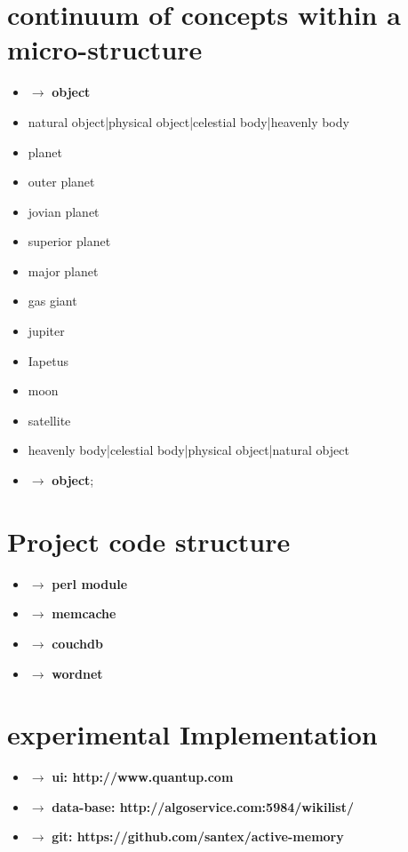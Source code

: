 \documentclass[15pt]{article}
\begin{document}
\vskip 0.4cm

\section{continuum of concepts within a micro-structure}  
  
\begin{itemize}
\item $\rightarrow$ \textbf{object}
\item natural object|physical object|celestial body|heavenly body
\item planet
\item outer planet
\item jovian planet
\item superior planet
\item major planet
\item gas giant
\item jupiter
\item Iapetus
\item moon
\item satellite
\item heavenly body|celestial body|physical object|natural object 
\item $\rightarrow$ \textbf{object};
\end{itemize}   
\vskip 9cm

\section{Project code structure}

\begin{itemize}
\item $\rightarrow$ \textbf{perl module}
\item $\rightarrow$ \textbf{memcache}
\item $\rightarrow$ \textbf{couchdb}
\item $\rightarrow$ \textbf{wordnet}
\end{itemize}   



\section{experimental Implementation}

\begin{itemize}
\item $\rightarrow$ \textbf{ui: http://www.quantup.com}
\item $\rightarrow$ \textbf{data-base: http://algoservice.com:5984/wikilist/}
\item $\rightarrow$ \textbf{git: https://github.com/santex/active-memory}
\end{itemize}   
\end{document}
